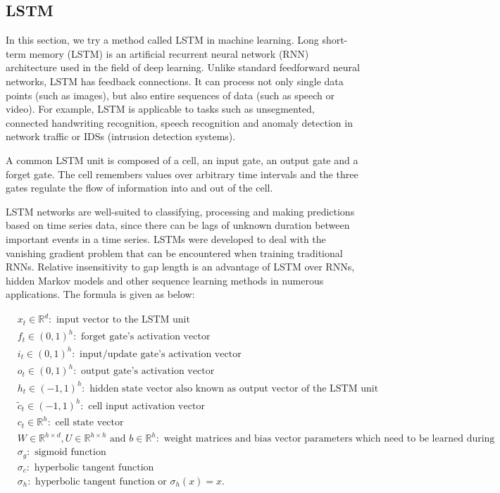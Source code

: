\documentclass[twoside]{report}
\begin{document}
\begin{spacing}{1}
\subsection{LSTM}
In this section, we try a method called LSTM in machine learning. Long short-term memory (LSTM) is an artificial recurrent neural network (RNN) architecture used in the field of deep learning. Unlike standard feedforward neural networks, LSTM has feedback connections. It can process not only single data points (such as images), but also entire sequences of data (such as speech or video). For example, LSTM is applicable to tasks such as unsegmented, connected handwriting recognition, speech recognition and anomaly detection in network traffic or IDSs (intrusion detection systems).

A common LSTM unit is composed of a cell, an input gate, an output gate and a forget gate. The cell remembers values over arbitrary time intervals and the three gates regulate the flow of information into and out of the cell.

LSTM networks are well-suited to classifying, processing and making predictions based on time series data, since there can be lags of unknown duration between important events in a time series. LSTMs were developed to deal with the vanishing gradient problem that can be encountered when training traditional RNNs. Relative insensitivity to gap length is an advantage of LSTM over RNNs, hidden Markov models and other sequence learning methods in numerous applications. The formula is given as below:

$$
\begin{aligned}
&x_{t} \in \mathbb{R}^{d}: \text { input vector to the LSTM unit } \\
&f_{t} \in(0,1)^{h}: \text { forget gate's activation vector } \\
&i_{t} \in(0,1)^{h}: \text { input/update gate's activation vector } \\
&o_{t} \in(0,1)^{h}: \text { output gate's activation vector } \\
&h_{t} \in(-1,1)^{h}: \text { hidden state vector also known as output vector of the LSTM unit } \\
&\tilde{c}_{t} \in(-1,1)^{h}: \text { cell input activation vector } \\
&c_{t} \in \mathbb{R}^{h}: \text { cell state vector } \\
&W \in \mathbb{R}^{h \times d}, U \in \mathbb{R}^{h \times h} \text { and } b \in \mathbb{R}^{h}: \text { weight matrices and bias vector parameters which need to be learned during training }\\
&\sigma_{g} :\text{ sigmoid function}\\
&\sigma_{c} :\text{ hyperbolic tangent function}\\
&\sigma_{h} :\text{ hyperbolic tangent function or  $\sigma_{h}(x)=x$.}
\end{aligned}
$$


\end{spacing}
\end{document}
